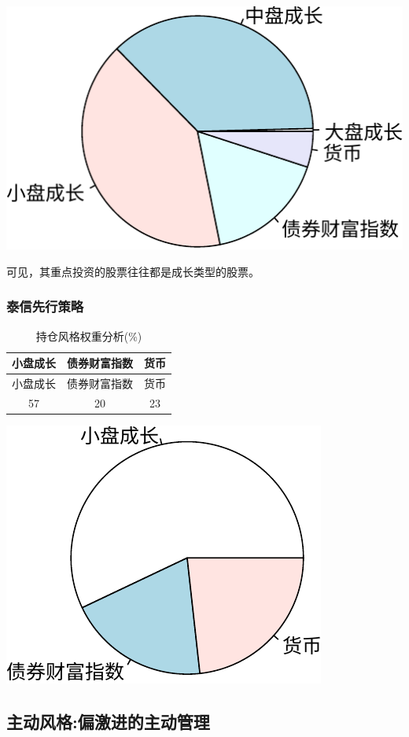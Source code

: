 \documentclass[hyperref,]{ctexart}
\begin{document}
\includegraphics{zzq-detail_files/figure-latex/unnamed-chunk-13-1.pdf}

可见，其重点投资的股票往往都是成长类型的股票。

\subsubsection{泰信先行策略}\label{-1}

\begin{longtable}[]{@{}ccc@{}}
\caption{持仓风格权重分析(\%)}\tabularnewline
\toprule
小盘成长 & 债券财富指数 & 货币\tabularnewline
\midrule
\endfirsthead
\toprule
小盘成长 & 债券财富指数 & 货币\tabularnewline
\midrule
\endhead
57 & 20 & 23\tabularnewline
\bottomrule
\end{longtable}

\includegraphics{zzq-detail_files/figure-latex/unnamed-chunk-14-1.pdf}

\subsection{主动风格:偏激进的主动管理}
\end{document}
